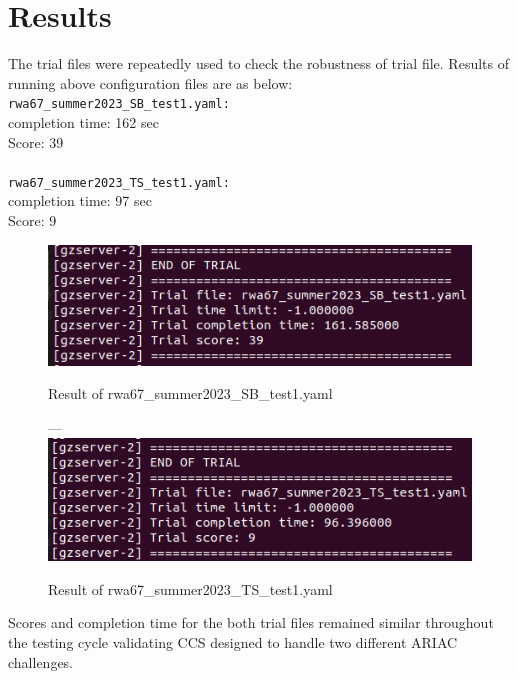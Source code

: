 \documentclass{uva-inf-article}
\begin{document}
\justifying
\section{Results}
The trial files were repeatedly used to check the robustness of trial file. Results of running above configuration files are as below:\\

\noindent \verb|rwa67_summer2023_SB_test1.yaml:|\\
completion time:  162 sec\\
Score: 39\\\\
\verb|rwa67_summer2023_TS_test1.yaml:|\\
completion time: 97 sec\\
Score: 9\\

\begin{figure}[h]
\centering
\includegraphics[scale=0.50]{images/rwa67_trial_11.png}
\caption{Result of rwa67\_summer2023\_SB\_test1.yaml}
\noindent ---\\
\includegraphics[scale=0.50]{images/rwa67_trial_12.png}
\caption{Result of rwa67\_summer2023\_TS\_test1.yaml}
\end{figure}

\noindent Scores and completion time for the both trial files remained similar throughout the testing cycle validating CCS designed to handle two different ARIAC challenges.

\justifying
\end{document}
